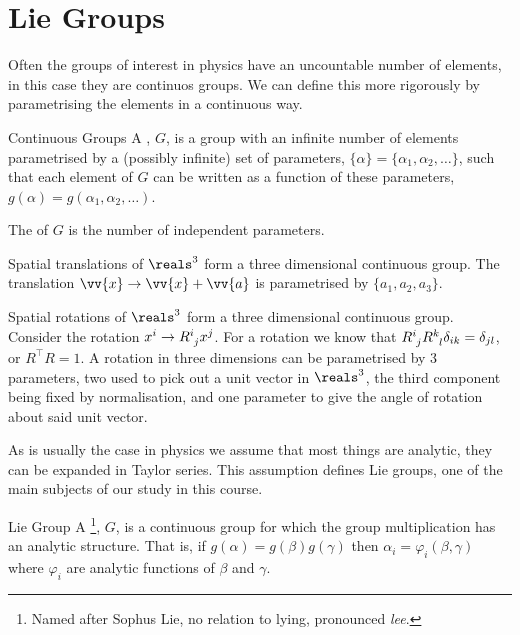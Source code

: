 \documentclass[fleqn]{NotesClass}
\newcommand{\ident}{1}
\newcommand{\trans}{\top}
\begin{document}
    \section{Lie Groups}
    Often the groups of interest in physics have an uncountable number of elements, in this case they are continuos groups.
    We can define this more rigorously by parametrising the elements in a continuous way.
    \begin{dfn}{Continuous Groups}{}
        A , \(G\), is a group with an infinite number of elements parametrised by a (possibly infinite) set of parameters, \(\{\alpha\} = \{\alpha_1, \alpha_2, \dotsc\}\), such that each element of \(G\) can be written as a function of these parameters, \(g(\alpha) = g(\alpha_1, \alpha_2, \dotsc)\).
        
        The  of \(G\) is the number of independent parameters.
    \end{dfn}
    
    \begin{exm}{}{}
        Spatial translations of \(\reals^3\) form a three dimensional continuous group.
        The translation \(\vv{x} \to \vv{x} + \vv{a}\) is parametrised by \(\{a_1, a_2, a_3\}\).
        
        Spatial rotations of \(\reals^3\) form a three dimensional continuous group.
        Consider the rotation \(x^i \to \tensor{R}{^i_j}x^j\).
        For a rotation we know that \(\tensor{R}{^i_j}\tensor{R}{^k_l} \delta_{ik} = \delta_{jl}\), or \(R^\trans R = \ident\).
        A rotation in three dimensions can be parametrised by 3 parameters, two used to pick out a unit vector in \(\reals^3\), the third component being fixed by normalisation, and one parameter to give the angle of rotation about said unit vector.
    \end{exm}
    
    As is usually the case in physics we assume that most things are analytic, they can be expanded in Taylor series.
    This assumption defines Lie groups, one of the main subjects of our study in this course.
    \begin{dfn}{Lie Group}{}
        A \footnote{Named after Sophus Lie, no relation to lying, pronounced \emph{lee}.}, \(G\), is a continuous group for which the group multiplication has an analytic structure.
        That is, if \(g(\alpha) = g(\beta)g(\gamma)\) then \(\alpha_i = \varphi_i(\beta, \gamma)\) where \(\varphi_i\) are analytic functions of \(\beta\) and \(\gamma\).
    \end{dfn}
    
\end{document}
